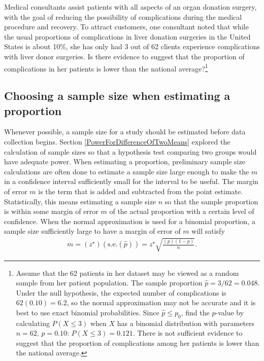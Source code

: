 \begin{exercise} Medical consultants assist patients with all aspects of an organ donation surgery, with the goal of reducing the possibility of complications during the medical procedure and recovery. To attract customers, one consultant noted that while the usual proportions of complications in liver donation surgeries in the United States is about 10\%, she has only had 3 out of 62 clients experience complications with liver donor surgeries. Is there evidence to suggest that the proportion of complications in her patients is lower than the national average?\footnote{Assume that the 62 patients in her dataset may be viewed as a random sample from her patient population. The sample proportion $\hat{p} = 3/62 = 0.048$. Under the null hypothesis, the expected number of complications is $62(0.10) = 6.2$, so the normal approximation may not be accurate and it is best to use exact binomial probabilities. Since $\hat{p} \leq p_0$, find the $p$-value by calculating $P(X \leq 3)$ when $X$ has a binomial distribution with parameters $n = 62,\, p = 0.10$: $P(X \leq 3) = 0.121$. There is not sufficient evidence to suggest that the proportion of complications among her patients is lower than the national average.}
\end{exercise}

\subsection{Choosing a sample size when estimating a proportion}


Whenever possible, a sample size for a study should be estimated before data collection begins.  Section \ref{PowerForDifferenceOfTwoMeans} explored the calculation of sample sizes so that a hypothesis test comparing two groups would have adequate power.  When estimating a proportion, preliminary sample size calculations are often done to estimate a sample size large enough to make the  $m$ in a confidence interval  sufficiently small for the interval to be useful. The margin of error $m$ is the term that is added and subtracted from the point estimate.  Statistically, this means estimating a sample size $n$ so that the sample proportion is within some margin of error $m$ of the actual proportion with a certain level of confidence. When the normal approximation is used for a binomial proportion, a sample size sufficiently large to have a margin of error of $m$ will satisfy 
\begin{align*}
 m = (z^{\star})(\text{s.e.}(\hat{p})) = z^{\star} \sqrt{\frac{(p)(1 - p)}{n}}. 
\end{align*}


